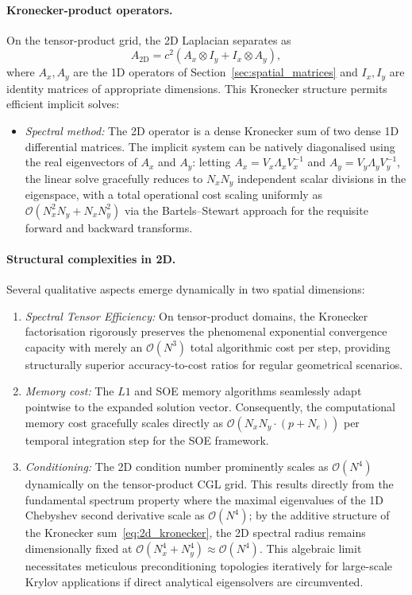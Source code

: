 \documentclass[a4paper,fleqn]{cas-sc}
\begin{document}
\begin{appendix}
\paragraph{Kronecker-product operators.}
On the tensor-product grid, the 2D Laplacian separates as
\begin{equation}\label{eq:2d_kronecker}
  A_{\mathrm{2D}} = c^2 \left( A_x \otimes I_y + I_x \otimes A_y \right),
\end{equation}
where $A_x, A_y$ are the 1D operators of Section~\ref{sec:spatial_matrices} and $I_x, I_y$ are identity matrices of appropriate dimensions. This Kronecker structure permits efficient implicit solves:
\begin{itemize}
  \item \emph{Spectral method:} The 2D operator is a dense Kronecker sum of two dense 1D differential matrices. The implicit system can be natively diagonalised using the real eigenvectors of $A_x$ and $A_y$: letting $A_x = V_x \Lambda_x V_x^{-1}$ and $A_y = V_y \Lambda_y V_y^{-1}$, the linear solve gracefully reduces to $N_x N_y$ independent scalar divisions in the eigenspace, with a total operational cost scaling uniformly as $\mathcal{O}(N_x^2 N_y + N_x N_y^2)$ via the Bartels--Stewart approach for the requisite forward and backward transforms.
\end{itemize}

\paragraph{Structural complexities in 2D.}
Several qualitative aspects emerge dynamically in two spatial dimensions:
\begin{enumerate}
  \item \emph{Spectral Tensor Efficiency:} On tensor-product domains, the Kronecker factorisation rigorously preserves the phenomenal exponential convergence capacity with merely an $\mathcal{O}(N^3)$ total algorithmic cost per step, providing structurally superior accuracy-to-cost ratios for regular geometrical scenarios.
  \item \emph{Memory cost:} The $L1$ and SOE memory algorithms seamlessly adapt pointwise to the expanded solution vector. Consequently, the computational memory cost gracefully scales directly as $\mathcal{O}(N_x N_y \cdot (p + N_e))$ per temporal integration step for the SOE framework.
  \item \emph{Conditioning:} The 2D condition number prominently scales as $\mathcal{O}(N^4)$ dynamically on the tensor-product CGL grid. This results directly from the fundamental spectrum property where the maximal eigenvalues of the 1D Chebyshev second derivative scale as $\mathcal{O}(N^4)$; by the additive structure of the Kronecker sum~\eqref{eq:2d_kronecker}, the 2D spectral radius remains dimensionally fixed at $\mathcal{O}(N_x^4 + N_y^4) \approx \mathcal{O}(N^4)$. This algebraic limit necessitates meticulous preconditioning topologies iteratively for large-scale Krylov applications if direct analytical eigensolvers are circumvented.
\end{enumerate}


\end{appendix}
\end{document}
